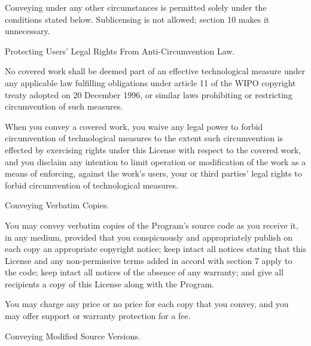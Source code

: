 Conveying under any other circumstances is permitted solely under the conditions stated below. Sublicensing is not allowed; section 10 makes it unnecessary.


\begin{DoxyEnumerate}
\item Protecting Users' Legal Rights From Anti-\/\+Circumvention Law.
\end{DoxyEnumerate}

No covered work shall be deemed part of an effective technological measure under any applicable law fulfilling obligations under article 11 of the W\+I\+P\+O copyright treaty adopted on 20 December 1996, or similar laws prohibiting or restricting circumvention of such measures.

When you convey a covered work, you waive any legal power to forbid circumvention of technological measures to the extent such circumvention is effected by exercising rights under this License with respect to the covered work, and you disclaim any intention to limit operation or modification of the work as a means of enforcing, against the work's users, your or third parties' legal rights to forbid circumvention of technological measures.


\begin{DoxyEnumerate}
\item Conveying Verbatim Copies.
\end{DoxyEnumerate}

You may convey verbatim copies of the Program's source code as you receive it, in any medium, provided that you conspicuously and appropriately publish on each copy an appropriate copyright notice; keep intact all notices stating that this License and any non-\/permissive terms added in accord with section 7 apply to the code; keep intact all notices of the absence of any warranty; and give all recipients a copy of this License along with the Program.

You may charge any price or no price for each copy that you convey, and you may offer support or warranty protection for a fee.


\begin{DoxyEnumerate}
\item Conveying Modified Source Versions.
\end{DoxyEnumerate}

